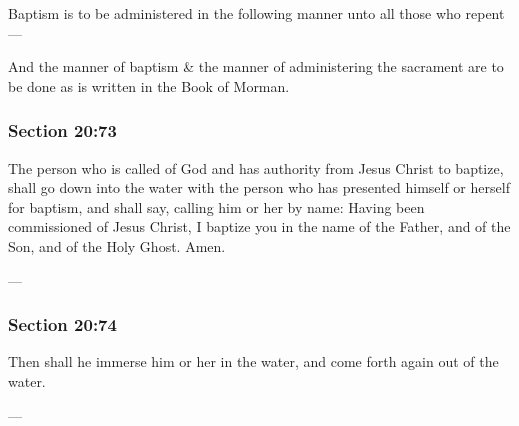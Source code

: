 		Baptism is to be administered in the following manner unto all those who repent---

		\begin{framed}
		\scriptsize
			\begin{compactdesc}
				\item[JSP] And the manner of baptism \& the manner of administering the sacrament are to be done as is written in the Book of Morman. 
				\item[RB1] 
				\item[BC] 
			\end{compactdesc}
		\end{framed}

	\subsubsection{Section 20:73} %
		\label{DC20-73}

		The person who is called of God and has authority from Jesus Christ to baptize, shall go down into the water with the person who has presented himself or herself for baptism, and shall say, calling him or her by name: Having been commissioned of Jesus Christ, I baptize you in the name of the Father, and of the Son, and of the Holy Ghost. Amen.

		\begin{framed}
		\scriptsize
			\begin{compactdesc}
				\item[JSP] ---
				\item[RB1] 
				\item[BC] 
			\end{compactdesc}
		\end{framed}

	\subsubsection{Section 20:74} %
		\label{DC20-74}

		Then shall he immerse him or her in the water, and come forth again out of the water.

		\begin{framed}
		\scriptsize
			\begin{compactdesc}
				\item[JSP] ---
				\item[RB1] 
				\item[BC] 
			\end{compactdesc}
		\end{framed}

